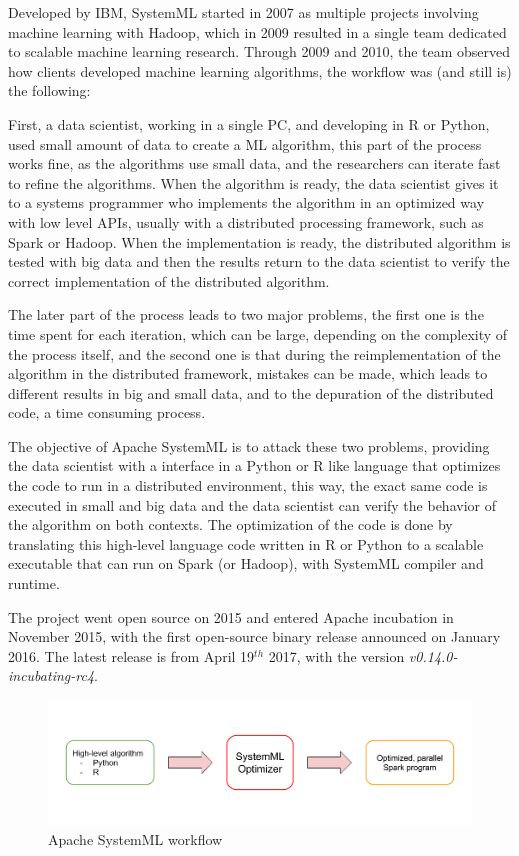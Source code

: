 \documentclass[11pt]{article} %
\begin{document}
    Developed by IBM, SystemML started in 2007 as multiple projects involving machine learning with Hadoop, which in 2009 resulted in a single team dedicated to scalable machine learning research. Through 2009 and 2010, the team observed how clients developed machine learning algorithms, the workflow was (and still is) the following:

    First, a data scientist, working in a single PC, and developing in R or Python, used small amount of data to create a ML algorithm, this part of the process works fine, as the algorithms use small data, and the researchers can iterate fast to refine the algorithms. When the algorithm is ready, the data scientist gives it to a systems programmer who implements the algorithm in an optimized way with low level APIs, usually with a distributed processing framework, such as Spark or Hadoop. When the implementation is ready, the distributed algorithm is tested with big data and then the results return to the data scientist to verify the correct implementation of the distributed algorithm.

    The later part of the process leads to two major problems, the first one is the time spent for each iteration, which can be large, depending on the complexity of the process itself, and the second one is that during the reimplementation of the algorithm in the distributed framework, mistakes can be made, which leads to different results in big and small data, and to the depuration of the distributed code, a time consuming process.

    The objective of Apache SystemML is to attack these two problems, providing the data scientist with a interface in a Python or R like language that optimizes the code to run in a distributed environment, this way, the exact same code is executed in small and big data and the data scientist can verify the behavior of the algorithm on both contexts. The optimization of the code is done by translating this high-level language code written in R or Python to a scalable executable that can run on Spark (or Hadoop), with SystemML compiler and runtime.

    The project went open source on 2015 and entered Apache incubation in November 2015, with the first open-source binary release announced on January 2016. The latest release is from April 19$^{th}$ 2017, with the version \emph{v0.14.0-incubating-rc4}.

    \begin{figure}[!ht]
      \centering
      \includegraphics[width=\textwidth]{systemml_objective.png}
      \caption{Apache SystemML workflow}
      \label{img:systemml_workflow}
    \end{figure}
\end{document}
